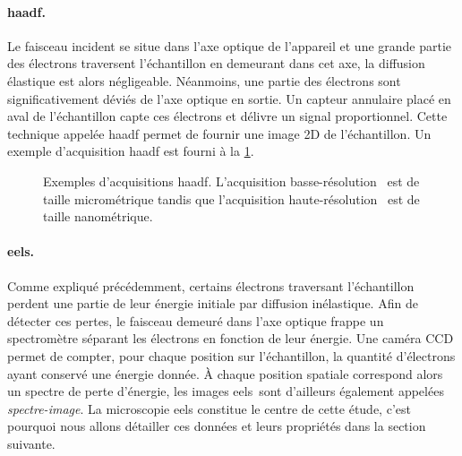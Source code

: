     \paragraph{\gls{haadf}.} Le faisceau incident se situe dans l'axe optique de l'appareil et une grande partie des électrons traversent l'échantillon en demeurant dans cet axe, la diffusion élastique est alors négligeable. Néanmoins, une partie des électrons sont significativement déviés de l'axe optique en sortie.  Un capteur annulaire placé en aval de l'échantillon capte ces électrons et délivre un signal proportionnel. Cette technique appelée \gls{haadf} permet de fournir une image 2D de l'échantillon. Un exemple d'acquisition \gls{haadf} est fourni à la \cref{fig-chap2-haadf-ex}.

    \begin{figure}%
    	\centering
        \hspace{1em}
        \caption{\protect\label{fig-chap2-haadf-ex}Exemples d'acquisitions \gls{haadf}. L'acquisition basse-résolution~\protect{} est de taille micrométrique  tandis que l'acquisition haute-résolution~\protect{} est de taille nanométrique.}
     \end{figure}


    \paragraph*{\gls{eels}.} Comme expliqué précédemment, certains électrons traversant l'échantillon  perdent une partie de leur énergie initiale par diffusion inélastique. Afin de détecter ces pertes, le faisceau demeuré dans l'axe optique frappe un spectromètre séparant les électrons en fonction de leur énergie. Une caméra CCD permet de compter, pour chaque position sur l'échantillon, la quantité d'électrons ayant conservé une énergie donnée. \`A chaque position spatiale correspond alors un spectre de perte d'énergie, les images \gls{eels} sont d'ailleurs également appelées \emph{spectre-image}. La microscopie \gls{eels} constitue le centre de cette étude, c'est pourquoi nous allons détailler ces données et leurs propriétés dans la section suivante.


